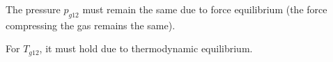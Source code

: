 The pressure \( p_{g12} \) must remain the same due to force equilibrium (the force compressing the gas remains the same).

For \( T_{g12} \), it must hold due to thermodynamic equilibrium.